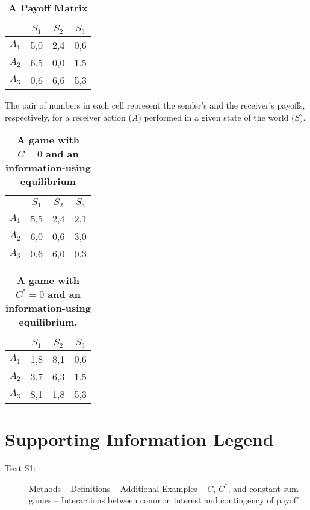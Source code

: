 \documentclass[10pt]{article}
\begin{document}
\begin{table}[!ht]
\caption{
\bf{A Payoff Matrix}}
\begin{tabular}{|c||c|c|c|}
& $S_{1}$ & $S_{2}$ & $S_{3}$ \\
\hline
$A_{1}$ & 5,0 & 2,4 & 0,6 \\
$A_{2}$ & 6,5 & 0,0 & 1,5 \\
$A_{3}$ & 0,6 & 6,6 & 5,3 \\
\end{tabular}
\begin{flushleft}The pair of numbers in each cell represent the sender's and the
receiver's payoffs, respectively, for a receiver action ($A$) performed
in a given state of the world ($S$).
\end{flushleft}
\label{tab:label}
\end{table}

\begin{table}[!ht]
\caption{
\bf{A game with $C=0$ and an information-using equilibrium}}
\begin{tabular}{|c||c|c|c|}
& $S_{1}$ & $S_{2}$ & $S_{3}$ \\
\hline
$A_{1}$ & 5,5 & 2,4 & 2,1 \\
$A_{2}$ & 6,0 & 0,6 & 3,0 \\
$A_{3}$ & 0,6 & 6,0 & 0,3 \\
\end{tabular}
\begin{flushleft}
\end{flushleft}
\label{tab:label}
 \end{table}

\begin{table}[!ht]
\caption{
\bf{A game with $C^*=0$ and an information-using equilibrium.}}
\begin{tabular}{|c||c|c|c|}
& $S_{1}$ & $S_{2}$ & $S_{3}$ \\
\hline
$A_{1}$ & 1,8 & 8,1 & 0,6 \\
$A_{2}$ & 3,7 & 6,3 & 1,5 \\
$A_{3}$ & 8,1 & 1,8 & 5,3 \\
\end{tabular}
\begin{flushleft}
\end{flushleft}
\label{tab:label}
 \end{table}

\section*{Supporting Information Legend}
\begin{description}
    \item[Text S1:]Methods -- Definitions -- Additional Examples -- $C$, $C^*$, and constant-sum games -- Interactions between common interest and contingency of payoff
\end{description}
\end{document}
